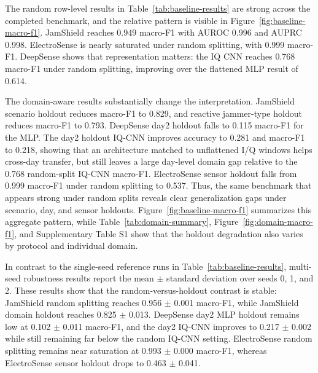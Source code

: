 \documentclass{ieeeaccess}
\begin{document}
The random row-level results in Table~\ref{tab:baseline-results} are strong across the completed benchmark, and the relative pattern is visible in Figure~\ref{fig:baseline-macro-f1}. JamShield reaches 0.949 macro-F1 with AUROC 0.996 and AUPRC 0.998. ElectroSense is nearly saturated under random splitting, with 0.999 macro-F1. DeepSense shows that representation matters: the IQ CNN reaches 0.768 macro-F1 under random splitting, improving over the flattened MLP result of 0.614.

The domain-aware results substantially change the interpretation. JamShield scenario holdout reduces macro-F1 to 0.829, and reactive jammer-type holdout reduces macro-F1 to 0.793. DeepSense day2 holdout falls to 0.115 macro-F1 for the MLP. The day2 holdout IQ-CNN improves accuracy to 0.281 and macro-F1 to 0.218, showing that an architecture matched to unflattened I/Q windows helps cross-day transfer, but still leaves a large day-level domain gap relative to the 0.768 random-split IQ-CNN macro-F1. ElectroSense sensor holdout falls from 0.999 macro-F1 under random splitting to 0.537. Thus, the same benchmark that appears strong under random splits reveals clear generalization gaps under scenario, day, and sensor holdouts. Figure~\ref{fig:baseline-macro-f1} summarizes this aggregate pattern, while Table~\ref{tab:domain-summary}, Figure~\ref{fig:domain-macro-f1}, and Supplementary Table S1 show that the holdout degradation also varies by protocol and individual domain.

In contrast to the single-seed reference runs in Table~\ref{tab:baseline-results}, multi-seed robustness results report the mean $\pm$ standard deviation over seeds 0, 1, and 2. These results show that the random-versus-holdout contrast is stable: JamShield random splitting reaches 0.956 $\pm$ 0.001 macro-F1, while JamShield domain holdout reaches 0.825 $\pm$ 0.013. DeepSense day2 MLP holdout remains low at 0.102 $\pm$ 0.011 macro-F1, and the day2 IQ-CNN improves to 0.217 $\pm$ 0.002 while still remaining far below the random IQ-CNN setting. ElectroSense random splitting remains near saturation at 0.993 $\pm$ 0.000 macro-F1, whereas ElectroSense sensor holdout drops to 0.463 $\pm$ 0.041.
\end{document}
